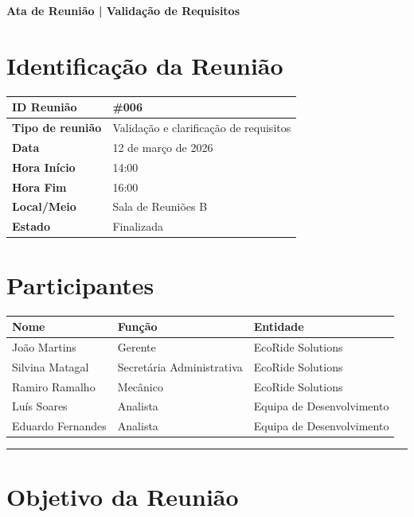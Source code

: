 \documentclass[12pt]{article}
\begin{document}
{\noindent\LARGE\bfseries\color{primaryblue} Ata de Reunião | Validação de Requisitos}

\vspace{0.4cm}

\section*{Identificação da Reunião}

\begin{tabularx}{\textwidth}{|l|X|}
\hline
\rowcolor{tablegray}
\textbf{ID Reunião} & \#006 \\ \hline
\textbf{Tipo de reunião} & Validação e clarificação de requisitos \\ \hline
\textbf{Data} & 12 de março de 2026 \\ \hline
\textbf{Hora Início} & 14:00 \\ \hline
\textbf{Hora Fim} & 16:00 \\ \hline
\textbf{Local/Meio} & Sala de Reuniões B \\ \hline
\textbf{Estado} & Finalizada \\ \hline
\end{tabularx}

\vspace{0.8cm}

\section*{Participantes}

\begin{tabularx}{\textwidth}{|l|l|X|}
\hline
\rowcolor{tablegray}
\textbf{Nome} & \textbf{Função} & \textbf{Entidade} \\ \hline
João Martins & Gerente & EcoRide Solutions \\ \hline
Silvina Matagal & Secretária Administrativa & EcoRide Solutions \\ \hline
Ramiro Ramalho & Mecânico & EcoRide Solutions \\ \hline
Luís Soares & Analista & Equipa de Desenvolvimento \\ \hline
Eduardo Fernandes & Analista & Equipa de Desenvolvimento \\ \hline
\end{tabularx}

\vspace{0.8cm}
\hrule %
\vspace{0.2cm}

\section*{Objetivo da Reunião}
\end{document}
